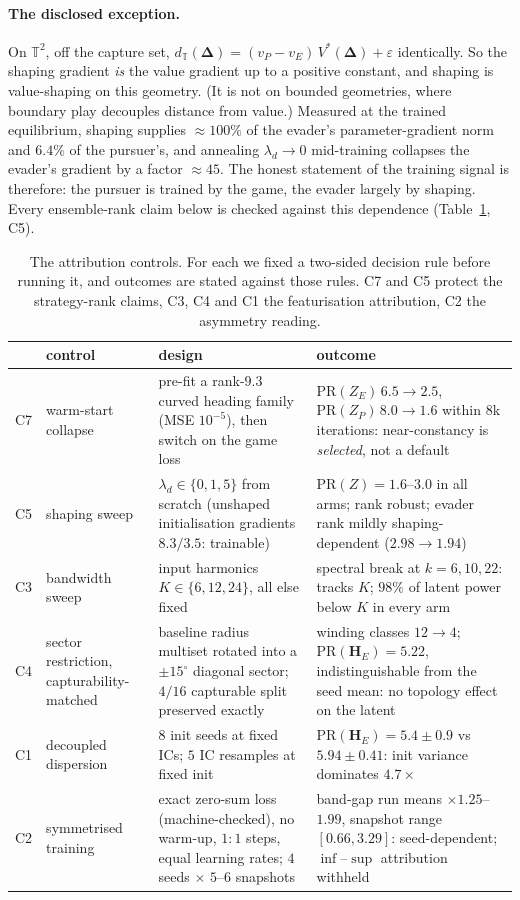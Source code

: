 \documentclass[twoside,11pt]{article}
\newcommand{\Dl}{\bm{\Delta}}
\newcommand{\HH}{\bm{H}}
\newcommand{\TT}{\mathbb{T}^{2}}
\newcommand{\PR}{\mathrm{PR}}
\begin{document}
\paragraph{The disclosed exception.}  On $\TT$, off the capture set,
$d_{\mathbb{T}}(\Dl) = (v_P - v_E)\,V^{*}(\Dl) + \varepsilon$
identically.  So the shaping gradient \emph{is} the value gradient up
to a positive constant, and shaping is value-shaping on this geometry.
(It is not on bounded geometries, where boundary play decouples
distance from value.)  Measured at the trained equilibrium, shaping
supplies $\approx\!100\%$ of the evader's parameter-gradient norm and
$6.4\%$ of the pursuer's, and annealing $\lambda_d \to 0$ mid-training
collapses the evader's gradient by a factor $\approx 45$.  The honest
statement of the training signal is therefore: the pursuer is trained
by the game, the evader largely by shaping.  Every ensemble-rank claim
below is checked against this dependence (Table~\ref{tab:controls},
C5).

\begin{table}[t]
\centering\footnotesize
\begin{tabular}{p{0.5cm}p{2.8cm}p{4.9cm}p{5.1cm}}
\toprule
 & control & design & outcome \\
\midrule
C7 & warm-start collapse & pre-fit a rank-$9.3$ curved heading family
(MSE $10^{-5}$), then switch on the game loss &
$\PR(Z_E)\,6.5 \to 2.5$, $\PR(Z_P)\,8.0 \to 1.6$ within $8$k
iterations: near-constancy is \emph{selected}, not a default \\[2pt]
C5 & shaping sweep & $\lambda_d \in \{0, 1, 5\}$ from scratch
(unshaped initialisation gradients $8.3/3.5$: trainable) &
$\PR(Z) = 1.6$--$3.0$ in all arms; rank robust; evader rank mildly
shaping-dependent ($2.98 \to 1.94$) \\[2pt]
C3 & bandwidth sweep & input harmonics $K \in \{6, 12, 24\}$, all
else fixed & spectral break at $k = 6, 10, 22$: tracks $K$;
$98\%$ of latent power below $K$ in every arm \\[2pt]
C4 & sector restriction, capturability-matched & baseline radius
multiset rotated into a $\pm 15^{\circ}$ diagonal sector; $4/16$
capturable split preserved exactly & winding classes $12 \to 4$;
$\PR(\HH_E) = 5.22$, indistinguishable from the seed mean: no
topology effect on the latent \\[2pt]
C1 & decoupled dispersion & $8$ init seeds at fixed ICs; $5$ IC
resamples at fixed init & $\PR(\HH_E) = 5.4 \pm 0.9$ vs
$5.94 \pm 0.41$: init variance dominates $4.7\times$ \\[2pt]
C2 & symmetrised training & exact zero-sum loss
(machine-checked), no warm-up, $1\!:\!1$ steps, equal learning
rates; $4$ seeds $\times$ $5$--$6$ snapshots & band-gap run means
$\times 1.25$--$1.99$, snapshot range $[0.66, 3.29]$:
seed-dependent; $\inf$--$\sup$ attribution withheld \\
\bottomrule
\end{tabular}
\caption{The attribution controls.  For each we fixed a two-sided
decision rule before running it, and outcomes are stated against those
rules.  C7 and C5 protect the strategy-rank claims, C3, C4 and C1 the
featurisation attribution, C2 the asymmetry reading.}
\label{tab:controls}
\end{table}
\end{document}
